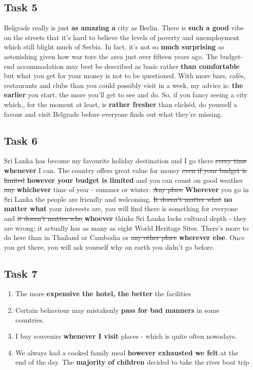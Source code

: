 \documentclass[a4paper]{article}
\begin{document}
\subsection{Task 5}
Belgrade really is just \textbf{as amazing a} city as Berlin. There is \textbf{such a good} vibe on the streets that it's hard to believe the levels of poverty and unemployment which still blight much of Serbia. In fact, it's not so \textbf{much surprising} as astonishing given how war tore the area just over fifteen years ago. The budget-end accommodation may best be described as basic rather \textbf{than comfortable} but what you get for your money is not to be questioned. With more bars, caf\'es, restaurants and clubs than you could possibly visit in a week, my advice is: \textbf{the earlier} you start, the more you'll get to see and do. So, if you fancy seeing a city which,, for the moment at least, is \textbf{rather fresher} than clich\'ed, do yourself a favour and visit Belgrade before everyone finds out what they're missing.
\subsection{Task 6}
Sri Lanka has become my favourite holiday destination and I go there \st{every time} \textbf{whenever} I can. The country offers great value for money \st{even if your budget is limited} \textbf{however your budget is limited} and you can count on good weather \st{any} \textbf{whichever} time of year - summer or winter. \st{Any place} \textbf{Wherever} you go in Sri Lanka the people are friendly and welcoming. \st{It doesn't matter what} \textbf{no matter what} your interests are, you will find there is something for everyone and \st{it doesn't matter who} \textbf{whoever} thinks Sri Lanka lacks cultural depth - they are wrong: it actually has as many as eight World Heritage Sites. There's more to do here than in Thailand or Cambodia or \st{any other place} \textbf{wherever else}. Once you get there, you will ask yourself why on earth you didn't go before.
\subsection{Task 7}
\begin{enumerate}
    \item The more \textbf{expensive the hotel, the better} the facilities
    \item Certain behaviour may mistakenly \textbf{pass for bad manners} in some countries.
    \item I buy souvenirs \textbf{whenever I visit} places - which is quite often nowadays.
    \item We always had a cooked family meal \textbf{however exhausted we felt} at the end of the day.
    The \textbf{majority of children} decided to take the river boat trip
\end{enumerate}
\end{document}
